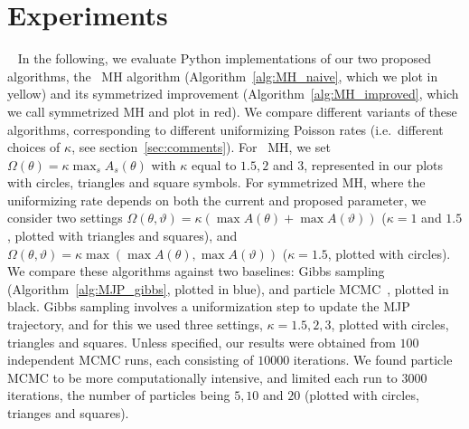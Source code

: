 \section{Experiments}\label{sec:expts}~
In the following, we evaluate Python implementations of our two proposed
algorithms, the \naive\ MH algorithm (Algorithm~\ref{alg:MH_naive}, which we
plot in yellow) and its symmetrized improvement (Algorithm~\ref{alg:MH_improved}, 
which we call symmetrized MH and plot in red). We compare 
different variants of these algorithms, corresponding to different 
uniformizing Poisson rates (i.e.\ different choices of $\kappa$, see 
section~\ref{sec:comments}). For \naive\ MH, %
we set $\Omega(\theta) = \kappa \max_s A_s(\theta) $ with $\kappa$  equal to 
$1.5, 2$ and $3$, represented in our plots with circles, triangles and square
symbols. For symmetrized MH, %
where the uniformizing rate depends 
on both the current and proposed parameter, we consider two settings
 $\Omega(\theta, \vartheta) = \kappa (\max A(\theta) + \max A(\vartheta))$ 
 ($\kappa = 1$ and $1.5$, plotted with {triangles} and {squares}), and 
$\Omega(\theta, \vartheta) = \kappa \max(\max A(\theta), \max A(\vartheta))$
($\kappa=1.5$, plotted with {circles}).  We compare these
algorithms against two baselines: Gibbs sampling (Algorithm~\ref{alg:MJP_gibbs},
plotted in blue), and particle MCMC~\citep{Andrieu10}, plotted in black. Gibbs
sampling involves a uniformization step to update the MJP trajectory, and for this
we used three settings, $\kappa=1.5,2,3$, plotted with circles, {triangles}
and {squares}.  Unless specified, our results were
obtained from $100$ independent MCMC runs, each consisting of $10000$ iterations.
We found particle MCMC to be more computationally intensive, and limited each 
run to $3000$ iterations, the number of particles being $5, 10$ and $20$ 
(plotted with circles, trianges and squares). 


